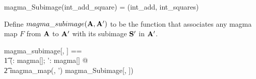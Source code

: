 \documentclass{amsart}
\begin{document}
\begin{example}

\begin{zed}
	magma\_Subimage(int\_add\_square) = (int\_add, int\_squares)
\end{zed}

\end{example}

Define $magma\_subimage(\mathbf{A}, \mathbf{A}')$ to be the function that associates any magma map $F$
from $\mathbf{A}$ to $\mathbf{A}'$ with its subimage $\mathbf{S}'$ in $\mathbf{A}'$.

\begin{zed}
	magma\_subimage[\genT, \genU] == \\
	\t1	(\lambda \strucA: magma[\genT]; \strucA': magma[\genU] @ \\
	\t2		magma\_map(\strucA, \strucA') \dres magma\_Subimage[\genT, \genU])
\end{zed} 
\end{document}
